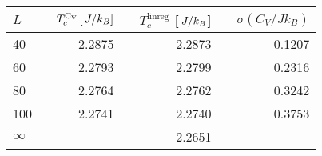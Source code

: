\begin{tabular}{lrrr}
\toprule
$L$ & $\quad T_c^\mathrm{C_V}\,[\,J/k_B]$ & $\quad T_c^\mathrm{linreg}$ [$\,J/k_B$] & $\quad\sigma(C_V/J k_B)$ \\
\midrule
40 & 2.2875 & 2.2873 & 0.1207 \\
60 & 2.2793 & 2.2799 & 0.2316 \\
80 & 2.2764 & 2.2762 & 0.3242 \\
100 & 2.2741 & 2.2740 & 0.3753 \\
$\infty$ &   & 2.2651 &  \\
\bottomrule
\end{tabular}
